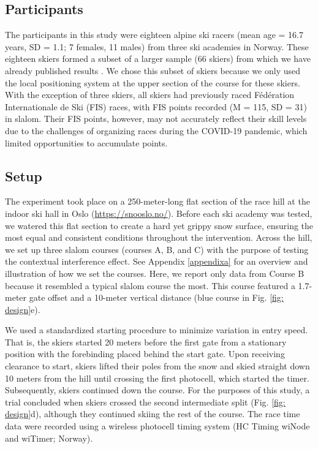 \documentclass{article}
\begin{document}
\subsection*{Participants}
The participants in this study were eighteen alpine ski racers (mean age = 16.7 years, SD = 1.1; 7 females, 11 males) from three ski academies in Norway. These eighteen skiers formed a subset of a larger sample (66 skiers) from which we have already published results \cite{magelssen_is_2022}. We chose this subset of skiers because we only used the local positioning system at the upper section of the course for these skiers. With the exception of three skiers, all skiers had previously raced Fédération Internationale de Ski (FIS) races, with FIS points recorded (M = 115, SD = 31) in slalom. Their FIS points, however, may not accurately reflect their skill levels due to the challenges of organizing races during the COVID-19 pandemic, which limited opportunities to accumulate points.

\subsection{Setup}
The experiment took place on a 250-meter-long flat section of the race hill at the indoor ski hall in Oslo (\url{https://snooslo.no/}). Before each ski academy was tested, we watered this flat section to create a hard yet grippy snow surface, ensuring the most equal and consistent conditions throughout the intervention. Across the hill, we set up three slalom courses (courses A, B, and C) with the purpose of testing the contextual interference effect\cite{magelssen_is_2022}. See Appendix \ref{appendixa} for an overview and illustration of how we set the courses. Here, we report only data from Course B because it resembled a typical slalom course the most. This course featured a 1.7-meter gate offset and a 10-meter vertical distance (blue course in Fig. \ref{fig: design}e). 

We used a standardized starting procedure to minimize variation in entry speed. That is, the skiers started 20 meters before the first gate from a stationary position with the forebinding placed behind the start gate. Upon receiving clearance to start, skiers lifted their poles from the snow and skied straight down 10 meters from the hill until crossing the first photocell, which started the timer. Subsequently, skiers continued down the course. For the purposes of this study, a trial concluded when skiers crossed the second intermediate split (Fig. \ref{fig: design}d), although they continued skiing the rest of the course. The race time data were recorded using a wireless photocell timing system (HC Timing wiNode and wiTimer; Norway).
\end{document}
